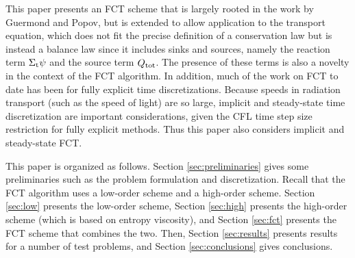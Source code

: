 This paper presents an FCT scheme that is largely rooted in the work by Guermond
and Popov, but is extended to allow application to the transport equation,
which does not fit the precise definition of a conservation law but is instead a
balance law since it includes sinks and sources, namely the reaction term
$\Sigma_\textup{t}\psi$ and the source term $Q_\textup{tot}$. The presence
of these terms is also a novelty in the context of the FCT algorithm.
In addition, much of the work on FCT to date has been for fully explicit time
discretizations. Because speeds in radiation transport (such as the speed of light)
are so large, implicit and steady-state time discretization are important
considerations, given the CFL time step size restriction for fully explicit
methods. Thus this paper also considers implicit and steady-state FCT.

This paper is organized as follows. Section \ref{sec:preliminaries} gives
some preliminaries such as the problem formulation and discretization.
Recall that the FCT algorithm uses a low-order scheme and a high-order scheme.
Section \ref{sec:low} presents the low-order scheme, Section \ref{sec:high}
presents the high-order scheme (which is based on entropy viscosity),
and Section \ref{sec:fct} presents the FCT scheme that combines the two. Then, Section
\ref{sec:results} presents results for a number of test problems, and
Section \ref{sec:conclusions} gives conclusions.
